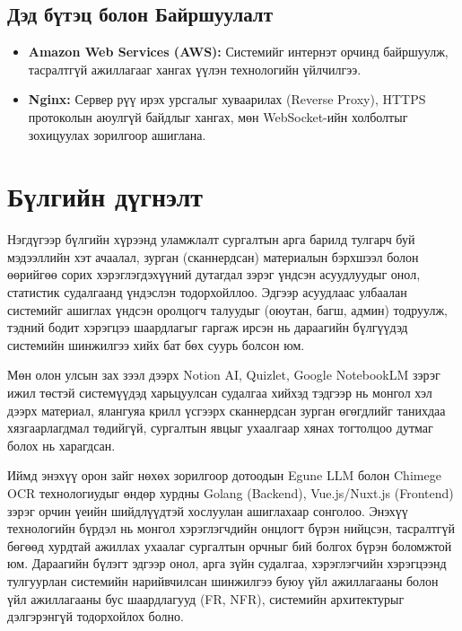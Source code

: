 \subsection{Дэд бүтэц болон Байршуулалт}
\begin{itemize}
    \item \textbf{Amazon Web Services (AWS):} Системийг интернэт орчинд байршуулж, тасралтгүй ажиллагааг хангах үүлэн технологийн үйлчилгээ.
    \item \textbf{Nginx:} Сервер рүү ирэх урсгалыг хуваарилах (Reverse Proxy), HTTPS протоколын аюулгүй байдлыг хангах, мөн WebSocket-ийн холболтыг зохицуулах зорилгоор ашиглана.
\end{itemize}

\section{Бүлгийн дүгнэлт}
Нэгдүгээр бүлгийн хүрээнд уламжлалт сургалтын арга барилд тулгарч буй мэдээллийн хэт ачаалал, зурган (сканнердсан) материалын бэрхшээл болон өөрийгөө сорих хэрэглэгдэхүүний дутагдал зэрэг үндсэн асуудлуудыг онол, статистик судалгаанд үндэслэн тодорхойллоо. Эдгээр асуудлаас улбаалан системийг ашиглах үндсэн оролцогч талуудыг (оюутан, багш, админ) тодруулж, тэдний бодит хэрэгцээ шаардлагыг гаргаж ирсэн нь дараагийн бүлгүүдэд системийн шинжилгээ хийх бат бөх суурь болсон юм.

Мөн олон улсын зах зээл дээрх Notion AI, Quizlet, Google NotebookLM зэрэг ижил төстэй системүүдэд харьцуулсан судалгаа хийхэд тэдгээр нь монгол хэл дээрх материал, ялангуяа крилл үсгээрх сканнердсан зурган өгөгдлийг танихдаа хязгаарлагдмал төдийгүй, сургалтын явцыг ухаалгаар хянах тогтолцоо дутмаг болох нь харагдсан. 

Иймд энэхүү орон зайг нөхөх зорилгоор дотоодын Egune LLM болон Chimege OCR технологиудыг өндөр хурдны Golang (Backend), Vue.js/Nuxt.js (Frontend) зэрэг орчин үеийн шийдлүүдтэй хослуулан ашиглахаар сонголоо. Энэхүү технологийн бүрдэл нь монгол хэрэглэгчдийн онцлогт бүрэн нийцсэн, тасралтгүй бөгөөд хурдтай ажиллах ухаалаг сургалтын орчныг бий болгох бүрэн боломжтой юм. Дараагийн бүлэгт эдгээр онол, арга зүйн судалгаа, хэрэглэгчийн хэрэгцээнд тулгуурлан системийн нарийвчилсан шинжилгээ буюу үйл ажиллагааны болон үйл ажиллагааны бус шаардлагууд (FR, NFR), системийн архитектурыг дэлгэрэнгүй тодорхойлох болно.